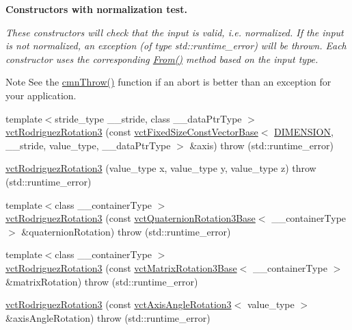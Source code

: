 \begin{Indent}{\bf Constructors with normalization test.}\par
{\em These constructors will check that the input is valid, i.\-e. normalized. If the input is not normalized, an exception (of type {\ttfamily std\-::runtime\-\_\-error}) will be thrown. Each constructor uses the corresponding \hyperlink{classvct_rodriguez_rotation3_base_aff389cf931841e2766d345425de672ea}{From()} method based on the input type.

\begin{DoxyNote}{Note}
See the \hyperlink{_minimal_cmn_8h_ad50e82cf9c9dbd0e6443c13e0d1a6f1a}{cmn\-Throw()} function if an {\ttfamily abort} is better than an exception for your application. 
\end{DoxyNote}
}\begin{DoxyCompactItemize}
\item 
{\footnotesize template$<$stride\-\_\-type \-\_\-\-\_\-stride, class \-\_\-\-\_\-data\-Ptr\-Type $>$ }\\\hyperlink{classvct_rodriguez_rotation3_a0fd3d7d1006135d82e8e729542c4009f}{vct\-Rodriguez\-Rotation3} (const \hyperlink{classvct_fixed_size_const_vector_base}{vct\-Fixed\-Size\-Const\-Vector\-Base}$<$ \hyperlink{classvct_rodriguez_rotation3_a7a58a7aa413585bc569bcf1f22656ae3a8bdaaaae91a14fa58479067f59ed9145}{D\-I\-M\-E\-N\-S\-I\-O\-N}, \-\_\-\-\_\-stride, value\-\_\-type, \-\_\-\-\_\-data\-Ptr\-Type $>$ \&axis)  throw (std\-::runtime\-\_\-error)
\item 
\hyperlink{classvct_rodriguez_rotation3_a63755a8e0e70b1ebe0e96a06481052f1}{vct\-Rodriguez\-Rotation3} (value\-\_\-type x, value\-\_\-type y, value\-\_\-type z)  throw (std\-::runtime\-\_\-error)
\item 
{\footnotesize template$<$class \-\_\-\-\_\-container\-Type $>$ }\\\hyperlink{classvct_rodriguez_rotation3_abd497e6d94f792ba40805716af2e2a08}{vct\-Rodriguez\-Rotation3} (const \hyperlink{classvct_quaternion_rotation3_base}{vct\-Quaternion\-Rotation3\-Base}$<$ \-\_\-\-\_\-container\-Type $>$ \&quaternion\-Rotation)  throw (std\-::runtime\-\_\-error)
\item 
{\footnotesize template$<$class \-\_\-\-\_\-container\-Type $>$ }\\\hyperlink{classvct_rodriguez_rotation3_a553610f7175091ae74bae7a211bef8e9}{vct\-Rodriguez\-Rotation3} (const \hyperlink{classvct_matrix_rotation3_base}{vct\-Matrix\-Rotation3\-Base}$<$ \-\_\-\-\_\-container\-Type $>$ \&matrix\-Rotation)  throw (std\-::runtime\-\_\-error)
\item 
\hyperlink{classvct_rodriguez_rotation3_a7cc0047e4f2d7b35548d742deed11b6a}{vct\-Rodriguez\-Rotation3} (const \hyperlink{classvct_axis_angle_rotation3}{vct\-Axis\-Angle\-Rotation3}$<$ value\-\_\-type $>$ \&axis\-Angle\-Rotation)  throw (std\-::runtime\-\_\-error)
\end{DoxyCompactItemize}
\end{Indent}
